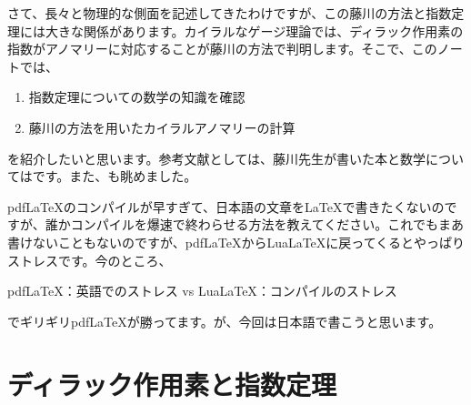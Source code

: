 \documentclass[unicode,a4paper,10pt]{ltjsarticle}
\begin{document}
さて、長々と物理的な側面を記述してきたわけですが、この藤川の方法と指数定理には大きな関係があります。カイラルなゲージ理論では、ディラック作用素の指数がアノマリーに対応することが藤川の方法で判明します。そこで、このノートでは、
\begin{enumerate}
  \item 
  指数定理についての数学の知識を確認
  \item 
  藤川の方法を用いたカイラルアノマリーの計算
\end{enumerate}
を紹介したいと思います。参考文献としては、藤川先生が書いた本\cite{Fujikawa:2001b}と数学については\cite{Nakahara:2003}です。また、\cite{Peskin:1995,Nair:2005}も眺めました。

\begin{graybox}
  {pdf\LaTeX}のコンパイルが早すぎて、日本語の文章を{\LaTeX}で書きたくないのですが、誰かコンパイルを爆速で終わらせる方法を教えてください。これでもまあ書けないこともないのですが、{pdf\LaTeX}から{Lua\LaTeX}に戻ってくるとやっぱりストレスです。今のところ、
  \begin{center}
    {pdf\LaTeX}：英語でのストレス
    \quad\textrm{vs}\quad
    {Lua\LaTeX}：コンパイルのストレス
  \end{center}
  でギリギリ{pdf\LaTeX}が勝ってます。が、今回は日本語で書こうと思います。
\end{graybox}


\section{ディラック作用素と指数定理}













\clearpage


\end{document}
